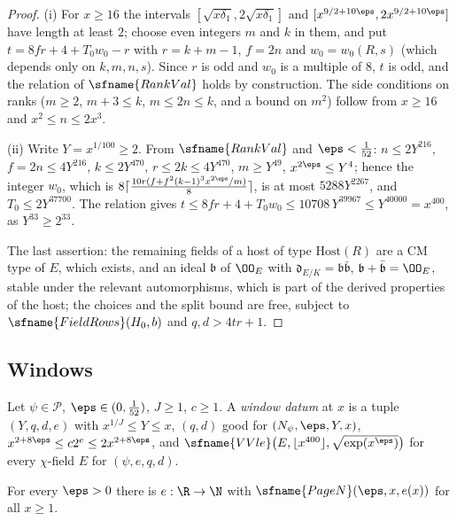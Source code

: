 \begin{proof}
(i) For $x\ge16$ the intervals $[\sqrt{x\delta_1},2\sqrt{x\delta_1}]$ and $[x^{9/2+10\eps},2x^{9/2+10\eps}]$ have length at
least $2$; choose even integers $m$ and $k$ in them, and put $t=8fr+4+T_0w_0-r$ with $r=k+m-1$, $f=2n$ and $w_0=w_0(R,s)$
(which depends only on $k,m,n,s$). Since $r$ is odd and $w_0$ is a multiple of $8$, $t$ is odd, and the relation of
$\sfname{RankVal}$ holds by construction. The side conditions on ranks ($m\ge2$, $m+3\le k$, $m\le2n\le k$, and a bound
on $m^2$) follow from $x\ge16$ and $x^2\le n\le2x^3$.

(ii) Write $Y=x^{1/100}\ge2$. From $\sfname{RankVal}$ and $\eps<\frac1{52}$: $n\le2Y^{216}$, $f=2n\le4Y^{216}$,
$k\le2Y^{470}$, $r\le2k\le4Y^{470}$, $m\ge Y^{49}$, $x^{2\eps}\le Y^4$; hence the integer $w_0$, which is
$8\lceil\frac{10r(f+f^2(k-1)^3x^{2\eps}/m)}8\rceil$, is at most $5288Y^{2267}$, and $T_0\le2Y^{37700}$. The relation gives
$t\le8fr+4+T_0w_0\le10708\,Y^{39967}\le Y^{40000}=x^{400}$, as $Y^{33}\ge2^{33}$.

The last assertion: the remaining fields of a host of type $\mathrm{Host}(R)$ are a CM type of $E$, which exists, and an
ideal $\mathfrak b$ of $\OO_E$ with $\mathfrak d_{E/K}=\mathfrak b\bar{\mathfrak b}$, $\mathfrak b+\bar{\mathfrak b}=\OO_E$, stable
under the relevant automorphisms, which is part of the derived properties of the host; the choices and the split bound are
free, subject to $\sfname{FieldRows}(H_0,b)$ and $q,d>4tr+1$.
\end{proof}

\subsection{Windows}\label{sec:pf:top-supply:windows}

\begin{definition}\label{pf:top-supply:windatum}
Let $\psi\in\mathcal P$, $\eps\in(0,\frac1{52})$, $J\ge1$, $c\ge1$. A \emph{window datum} at $x$ is a tuple $(Y,q,d,e)$
with $x^{1/J}\le Y\le x$, $(q,d)$ good for $(N_\psi,\eps,Y,x)$, $x^{2+8\eps}\le c2^e\le2x^{2+8\eps}$, and
$\sfname{VVle}\big(E,\lfloor x^{400}\rfloor,\sqrt{\exp(x^\eps)}\big)$ for every $\chi$-field $E$ for $(\psi,e,q,d)$.
\end{definition}

\begin{lemma}\label{pf:top-supply:vvle}
For every $\eps>0$ there is $e:\R\to\N$ with $\sfname{PageN}(\eps,x,e(x))$ for all $x\ge1$.
\end{lemma}

